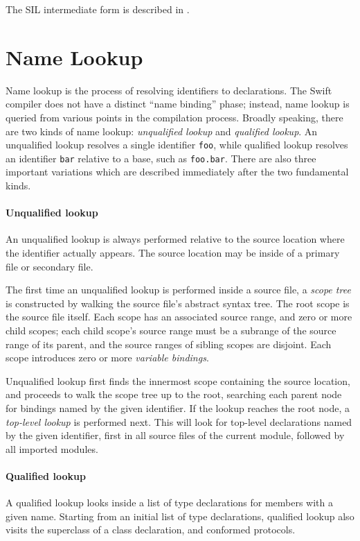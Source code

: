 \documentclass[a4paper,headsepline,bibliography=totoc,toc=flat,fleqn,twoside=semi]{scrbook}
\theoremstyle{definition}
\theoremstyle{definition}
\theoremstyle{definition}
\begin{document}
The SIL intermediate form is described in \cite{sil}.

\section{Name Lookup}\label{name lookup}

Name lookup is the process of resolving identifiers to declarations. The Swift compiler does not have a distinct ``name binding'' phase; instead, name lookup is queried from various points in the compilation process. Broadly speaking, there are two kinds of name lookup: \emph{unqualified lookup} and \emph{qualified lookup}. An unqualified lookup resolves a single identifier \texttt{foo}, while qualified lookup resolves an identifier \texttt{bar} relative to a base, such as \texttt{foo.bar}. There are also three important variations which are described immediately after the two fundamental kinds.

\paragraph{Unqualified lookup}
An unqualified lookup is always performed relative to the source location where the identifier actually appears. The source location may be inside of a primary file or secondary file. 

The first time an unqualified lookup is performed inside a source file, a \emph{scope tree} is constructed by walking the source file's abstract syntax tree. The root scope is the source file itself. Each scope has an associated source range, and zero or more child scopes; each child scope's source range must be a subrange of the source range of its parent, and the source ranges of sibling scopes are disjoint. Each scope introduces zero or more \emph{variable bindings}. 

Unqualified lookup first finds the innermost scope containing the source location, and proceeds to walk the scope tree up to the root, searching each parent node for bindings named by the given identifier. If the lookup reaches the root node, a \emph{top-level lookup} is performed next. This will look for top-level declarations named by the given identifier, first in all source files of the current module, followed by all imported modules.

\paragraph{Qualified lookup}
A qualified lookup looks inside a list of type declarations for members with a given name. Starting from an initial list of type declarations, qualified lookup also visits the superclass of a class declaration, and conformed protocols.
\end{document}
